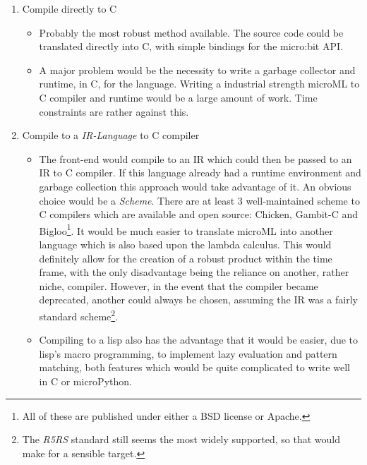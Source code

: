 \documentclass[11pt, a4paper]{article}
\begin{document}
\begin{enumerate}
    \item Compile directly to C
        \begin{itemize}
                \item Probably the most robust method available. The source code could be translated
                    directly into C, with simple bindings for the micro:bit API.
                \item A major problem would be the necessity to write a garbage collector and
                    runtime, in C, for the language. Writing a industrial strength microML to C compiler and runtime would be a large amount of 
                    work. Time constraints are rather against this.
        \end{itemize}
    \item Compile to a \textit{IR-Language} to C compiler
        \begin{itemize}
            \item The front-end would compile to an IR which could then be passed to an IR to C
                    compiler. If this language already had a runtime environment and garbage
                    collection this approach would take advantage of it. An obvious choice would be a \textit{Scheme}. 
                    There are at least 3 well-maintained scheme to C compilers which are available and open source:
                    Chicken, Gambit-C and Bigloo\footnote{All of these are published under either a
                    BSD license or Apache.}. It would be much easier to translate microML into
                    another language which is also based upon the lambda calculus. This would
                    definitely allow for the creation of a robust product within the time frame, with
                    the only disadvantage being the reliance on another, rather niche, compiler.
                    However, in the event that the compiler became deprecated, another could always
                    be chosen, assuming the IR was a fairly standard scheme\footnote{The
                    \textit{R5RS} standard still seems the most widely supported, so that would make
                    for a sensible target.}.
            \item Compiling to a lisp also has the advantage that it would be easier, due to lisp's
                macro programming, to implement lazy evaluation and pattern matching, both features
                which would be quite complicated to write well in C or microPython.
        \end{itemize}

\end{enumerate}
\end{document}
